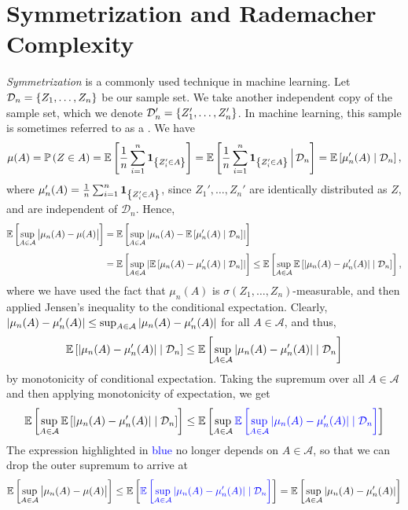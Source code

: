 \section{Symmetrization and Rademacher Complexity}
\label{sec: symmetrization}

\emph{Symmetrization} is a commonly used technique in machine learning. Let $\mathcal{D}_n = \left\{Z_1, \dots, Z_n\right\}$ be our sample set. We take another independent copy of the sample set, which we denote $\mathcal{D}_n' = \left\{Z_1', \dots, Z_n'\right\}$. In machine learning, this sample is sometimes referred to as a . We have
\[
    \mu(A) = \mathbb{P}\left(Z \in A\right) = \mathbb{E}\left[\frac{1}{n} \sum_{i=1}^n \mathbf{1}_{\left\{Z_i' \in A\right\}}\right] = \mathbb{E}\left[\frac{1}{n} \sum_{i=1}^n \mathbf{1}_{\left\{Z_i' \in A\right\}} \,\Big\vert\, \mathcal{D}_n\right] = \mathbb{E}\left[\mu_n'(A) \mathrel{|} \mathcal{D}_n\right],
\]
where $\mu_n'(A) = \frac{1}{n} \sum_{i=1}^n \mathbf{1}_{\left\{Z_i' \in A\right\}}$, since $Z_1', \dots, Z_n'$ are identically distributed as $Z$, and are independent of $\mathcal{D}_n$. Hence,
\begin{align*}
    \mathbb{E}\left[\sup_{A \in \mathcal{A}} \big\lvert \mu_n(A) - \mu(A) \big\rvert\right] &= \mathbb{E}\left[\sup_{A \in \mathcal{A}} \abs{ \mu_n(A) - \mathbb{E}\left[\mu_n'(A) \mathrel{|} \mathcal{D}_n\right] }\right] \\[4pt]
        &= \mathbb{E}\left[\sup_{A \in \mathcal{A}} \abs{ \mathbb{E}\left[\mu_n(A) - \mu_n'(A) \mathrel{|} \mathcal{D}_n\right] }\right] \leq \mathbb{E}\left[\sup_{A \in \mathcal{A}} \mathbb{E}\left[\abs{ \mu_n(A) - \mu_n'(A) } \mathrel{|} \mathcal{D}_n\right] \right],
\end{align*}
where we have used the fact that $\mu_n(A)$ is $\sigma(Z_1, \dots, Z_n)$-measurable, and then applied Jensen's inequality to the conditional expectation. Clearly, $\abs{ \mu_n(A) - \mu_n'(A) } \leq \sup_{A \in \mathcal{A}} \abs{ \mu_n(A) - \mu_n'(A) }$ for all $A \in \mathcal{A}$, and thus,
\[
    \mathbb{E}\left[\abs{ \mu_n(A) - \mu_n'(A) } \mathrel{|} \mathcal{D}_n\right] \leq \mathbb{E}\left[\sup_{A \in \mathcal{A}} \abs{ \mu_n(A) - \mu_n'(A) } \mathrel{|} \mathcal{D}_n\right]
\]
by monotonicity of conditional expectation. Taking the supremum over all $A \in \mathcal{A}$ and then applying monotonicity of expectation, we get
\[
    \mathbb{E}\left[\sup_{A \in \mathcal{A}} \mathbb{E}\left[\abs{ \mu_n(A) - \mu_n'(A) } \mathrel{|} \mathcal{D}_n\right] \right] \leq \mathbb{E}\left[\sup_{A \in \mathcal{A}} {\color{blue} \mathbb{E}\left[\sup_{A \in \mathcal{A}} \abs{ \mu_n(A) - \mu_n'(A) } \mathrel{|} \mathcal{D}_n\right] }\right]
\]
The expression highlighted in \textcolor{blue}{blue} no longer depends on $A \in \mathcal{A}$, so that we can drop the outer supremum to arrive at
\[
    \mathbb{E}\left[\sup_{A \in \mathcal{A}} \big\lvert \mu_n(A) - \mu(A) \big\rvert\right] \leq \mathbb{E}\left[ {\color{blue} \mathbb{E}\left[\sup_{A \in \mathcal{A}} \abs{ \mu_n(A) - \mu_n'(A) } \mathrel{|} \mathcal{D}_n\right] }\right] = \mathbb{E}\left[\sup_{A \in \mathcal{A}} \abs{ \mu_n(A) - \mu_n'(A) }\right]
\]

